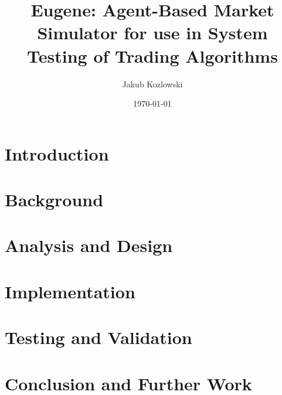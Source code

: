 \documentclass{report}
\title{Eugene: Agent-Based Market Simulator for use in System Testing of Trading Algorithms}
\author{Jakub Kozlowski}
\date{\today}
\begin{document}
\maketitle

\tableofcontents

\chapter{Introduction}





\chapter{Background}

\chapter{Analysis and Design}

\chapter{Implementation}

\chapter{Testing and Validation}

\chapter{Conclusion and Further Work}
\end{document}
